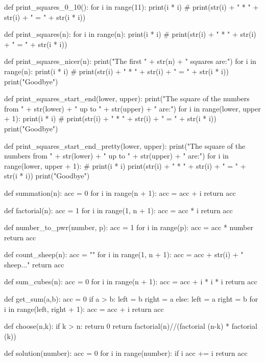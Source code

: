 \documentclass[class=scrartcl, crop=false]{standalone}
\newcommand{\expandpyconc}[1]{\expandafter\reallyexpandpyconc\expandafter{#1}}
\newcommand{\reallyexpandpyconc}[1]{\pyconc{exec(compile(open('#1', 'rb').read(), '#1', 'exec'))}}
\newenvironment{pyconcodeblck}[1]
{\newcommand{\snippetfile}{snippet-#1.py}
	\VerbatimEnvironment
	\begin{VerbatimOut}{\snippetfile}}
	{\end{VerbatimOut}
	\expandpyconc{\snippetfile}}
\begin{document}
\begin{pyconcodeblck}{for_schleifen}
def print_squares_0_10():
    for i in range(11):
        print(i * i)
        # print(str(i) + " * " + str(i)  + " = " + str(i * i))


def print_squares(n):
    for i in range(n):
        print(i * i)
        # print(str(i) + " * " + str(i)  + " = " + str(i * i))


def print_squares_nicer(n):
    print("The first " + str(n) + " squares are:")
    for i in range(n):
        print(i * i)
        # print(str(i) + " * " + str(i)  + " = " + str(i * i))
    print("Goodbye")


def print_squares_start_end(lower, upper):
    print("The square of the numbers from " + str(lower) + " up to " + str(upper) + " are:")
    for i in range(lower, upper + 1):
        print(i * i)
        # print(str(i) + " * " + str(i)  + " = " + str(i * i))
    print("Goodbye")

def print_squares_start_end_pretty(lower, upper):
    print("The square of the numbers from " + str(lower) + " up to " + str(upper) + " are:")
    for i in range(lower, upper + 1):
        # print(i * i)
        print(str(i) + " * " + str(i)  + " = " + str(i * i))
    print("Goodbye")



def summation(n):
    acc = 0
    for i in range(n + 1):
        acc = acc + i
    return acc

def factorial(n):
    acc = 1 
    for i in range(1, n + 1):
        acc = acc * i
    return acc

def number_to_pwr(number, p): 
    acc = 1
    for i in range(p):
        acc = acc * number
    return acc


def count_sheep(n):
    acc = "" 
    for i in range(1, n + 1):
        acc = acc + str(i) + " sheep..."
    return acc

def sum_cubes(n):
    acc = 0
    for i in range(n + 1):
        acc = acc + i * i * i
    return acc

def get_sum(a,b):
    acc = 0
    if a > b:
        left = b
        right = a
    else:
        left = a
        right = b
    for i in range(left, right + 1):
        acc = acc + i
    return acc

def choose(n,k):
    if k > n:
        return 0
    return factorial(n)//(factorial (n-k) * factorial (k))



def solution(number):
    acc = 0
    for i in range(number):
        if i %
            acc  += i
    return acc



\end{pyconcodeblck}
\end{document}
